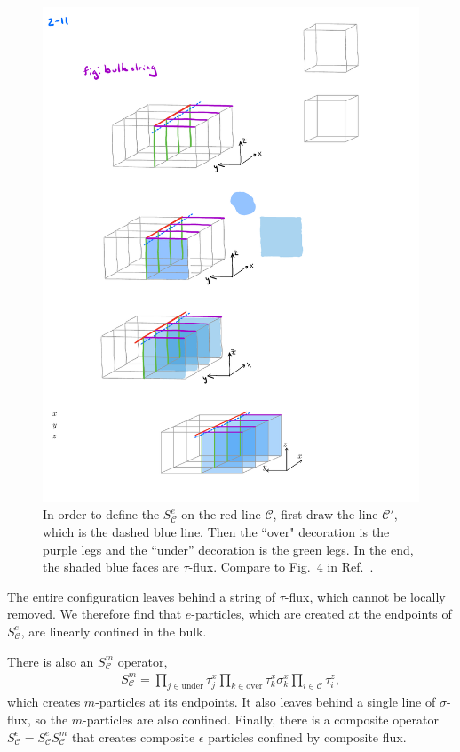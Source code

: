 \documentclass[twocolumn, longbibliography]{revtex4-2}
\newcommand{\C}{\mathcal{C}}
\begin{document}
\begin{figure}
\centering
\includegraphics{bulkstring}
\caption{In order to define the $S_\C^e$ on the red line $\C$, first draw the line $\C'$, which is the dashed blue line. Then the ``over" decoration is the purple legs and the ``under'' decoration is the green legs. In the end, the shaded blue faces are $\tau$-flux. Compare to Fig.~4 in Ref.~\cite{BurnellSoluble}.}
\label{fig:bulkstring}
\end{figure}

The entire configuration leaves behind a string of $\tau$-flux, which cannot be locally removed. We therefore find that $e$-particles, which are created at the endpoints of $S^e_\C$, are linearly confined in the bulk.

There is also an $S^m_\mathcal{C}$ operator,
\begin{align}
S^m_\mathcal{C} = \prod_{j\in\text{under}} \tau^x_j  \prod_{k\in\text{over}} \tau^x_k \sigma^x_k \prod_{i\in\mathcal{C}}\tau^z_i,
\end{align}
which creates $m$-particles at its endpoints. It also leaves behind a single line of $\sigma$-flux, so the $m$-particles are also confined. Finally, there is a composite operator $S^\epsilon_\C=S^e_\C S^m_\C$ that creates composite $\epsilon$ particles confined by composite flux.
\end{document}

